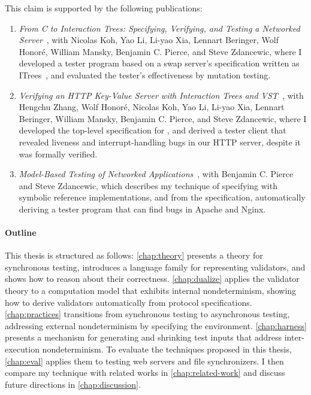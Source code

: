This claim is supported by the following publications:
\begin{enumerate}
\item {\it From C to Interaction Trees: Specifying, Verifying, and Testing a
  Networked Server}~\citep{cpp19}, with Nicolas Koh, Yao Li, Li-yao Xia, Lennart
  Beringer, Wolf Honor\'e, William Mansky, Benjamin C. Pierce, and Steve
  Zdancewic, where I developed a tester program based on a swap server's
  specification written as ITrees~\citep{itree}, and evaluated the tester's
  effectiveness by mutation testing.
\item {\it Verifying an HTTP Key-Value Server with Interaction Trees and
  VST}~\citep{itp21}, with Hengchu Zhang, Wolf Honor\'e, Nicolas Koh, Yao Li,
  Li-yao Xia, Lennart Beringer, William Mansky, Benjamin C. Pierce, and Steve
  Zdancewic, where I developed the top-level specification for \http, and
  derived a tester client that revealed liveness and interrupt-handling bugs in
  our HTTP server, despite it was formally verified.
\item {\it Model-Based Testing of Networked Applications}~\citep{issta21}, with
  Benjamin C. Pierce and Steve Zdancewic, which describes my technique of
  specifying \http with symbolic reference implementations, and from the
  specification, automatically deriving a tester program that can find bugs in
  Apache and Nginx.
\end{enumerate}

\paragraph{Outline}
This thesis is structured as follows: \autoref{chap:theory} presents a theory
for synchronous testing, introduces a language family for representing
validators, and shows how to reason about their correctness.
\autoref{chap:dualize} applies the validator theory to a computation model
that exhibits internal nondeterminism, showing how to derive validators
automatically from protocol specifications.
\autoref{chap:practices} transitions from synchronous testing to asynchronous
testing, addressing external nondeterminism by specifying the environment.
\autoref{chap:harness} presents a mechanism for generating and shrinking test
inputs that address inter-execution nondeterminism.  To evaluate the techniques
proposed in this thesis, \autoref{chap:eval} applies them to testing web servers
and file synchronizers.  I then compare my technique with related works
in \autoref{chap:related-work} and discuss future directions in
\autoref{chap:discussion}.
